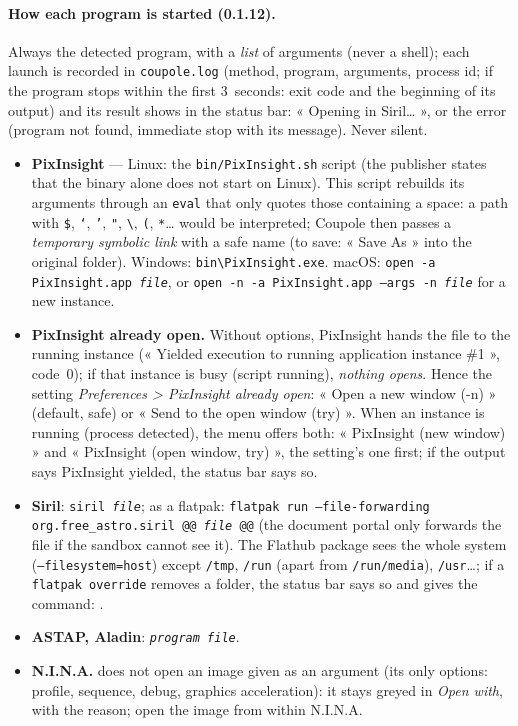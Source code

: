 \paragraph{How each program is started (0.1.12).} Always the detected program, with a \emph{list} of arguments
(never a shell); each launch is recorded in \texttt{coupole.log} (method, program, arguments, process id; if the
program stops within the first 3~seconds: exit code and the beginning of its output) and its result shows in the
status bar: « Opening in Siril… », or the error (program not found, immediate stop with its message). Never silent.
\begin{itemize}
  \item \textbf{PixInsight} — Linux: the \texttt{bin/PixInsight.sh} script (the publisher states that the binary
  alone does not start on Linux). This script rebuilds its arguments through an \texttt{eval} that only quotes those
  containing a space: a path with \texttt{\$}, \texttt{`}, \texttt{'}, \texttt{"}, \texttt{\textbackslash},
  \texttt{(}, \texttt{*}… would be interpreted; Coupole then passes a \emph{temporary symbolic link} with a safe
  name (to save: « Save As » into the original folder). Windows: \texttt{bin\textbackslash PixInsight.exe}. macOS:
  \texttt{open -a PixInsight.app \emph{file}}, or \texttt{open -n -a PixInsight.app --args -n \emph{file}} for a new
  instance.
  \item \textbf{PixInsight already open.} Without options, PixInsight hands the file to the running instance
  (« Yielded execution to running application instance \#1 », code~0); if that instance is busy (script running),
  \emph{nothing opens}. Hence the setting \emph{Preferences > PixInsight already open}: « Open a new window (-n) »
  (default, safe) or « Send to the open window (try) ». When an instance is running (process detected), the menu
  offers both: « PixInsight (new window) » and « PixInsight (open window, try) », the setting's one first; if the
  output says PixInsight yielded, the status bar says so.
  \item \textbf{Siril}: \texttt{siril \emph{file}}; as a flatpak: \texttt{flatpak run --file-forwarding
  org.free\_astro.siril @@ \emph{file} @@} (the document portal only forwards the file if the sandbox cannot see it).
  The Flathub package sees the whole system (\texttt{--filesystem=host}) except \texttt{/tmp}, \texttt{/run}
  (apart from \texttt{/run/media}), \texttt{/usr}…; if a \texttt{flatpak override} removes a folder, the status bar
  says so and gives the command: .
  \item \textbf{ASTAP, Aladin}: \texttt{\emph{program} \emph{file}}.
  \item \textbf{N.I.N.A.} does not open an image given as an argument (its only options: profile, sequence, debug,
  graphics acceleration): it stays greyed in \emph{Open with}, with the reason; open the image from within N.I.N.A.
\end{itemize}

